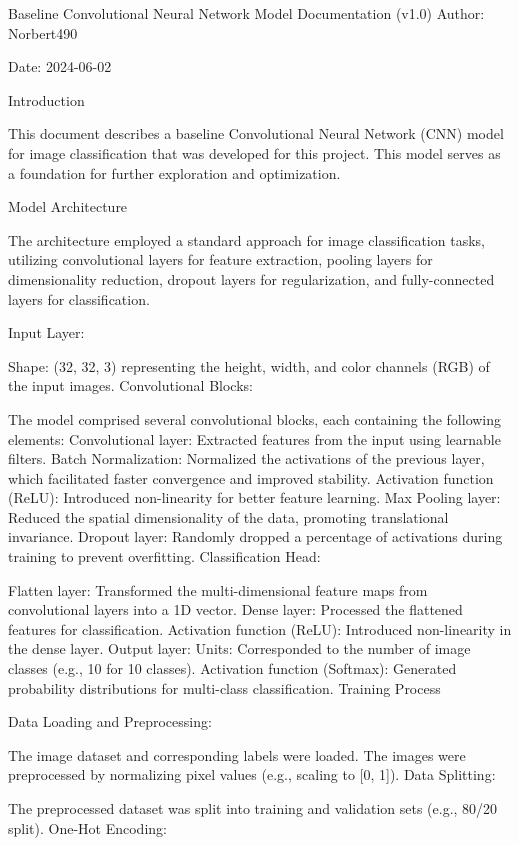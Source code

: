 Baseline Convolutional Neural Network Model Documentation (v1.0)
Author: Norbert490

Date: 2024-06-02

Introduction

This document describes a baseline Convolutional Neural Network (CNN) model for image classification that was developed for this project. This model serves as a foundation for further exploration and optimization.

Model Architecture

The architecture employed a standard approach for image classification tasks, utilizing convolutional layers for feature extraction, pooling layers for dimensionality reduction, dropout layers for regularization, and fully-connected layers for classification.

Input Layer:

Shape: (32, 32, 3) representing the height, width, and color channels (RGB) of the input images.
Convolutional Blocks:

The model comprised several convolutional blocks, each containing the following elements:
Convolutional layer: Extracted features from the input using learnable filters.
Batch Normalization: Normalized the activations of the previous layer, which facilitated faster convergence and improved stability.
Activation function (ReLU): Introduced non-linearity for better feature learning.
Max Pooling layer: Reduced the spatial dimensionality of the data, promoting translational invariance.
Dropout layer: Randomly dropped a percentage of activations during training to prevent overfitting.
Classification Head:

Flatten layer: Transformed the multi-dimensional feature maps from convolutional layers into a 1D vector.
Dense layer: Processed the flattened features for classification.
Activation function (ReLU): Introduced non-linearity in the dense layer.
Output layer:
Units: Corresponded to the number of image classes (e.g., 10 for 10 classes).
Activation function (Softmax): Generated probability distributions for multi-class classification.
Training Process

Data Loading and Preprocessing:

The image dataset and corresponding labels were loaded.
The images were preprocessed by normalizing pixel values (e.g., scaling to [0, 1]).
Data Splitting:

The preprocessed dataset was split into training and validation sets (e.g., 80/20 split).
One-Hot Encoding:

